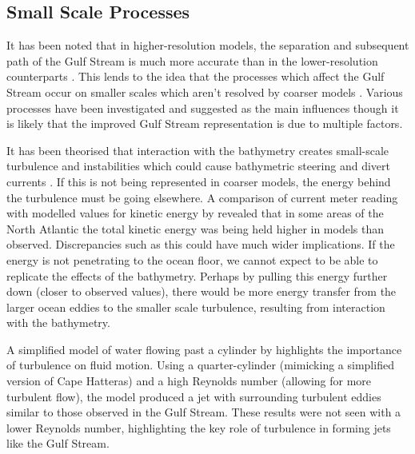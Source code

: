 \documentclass[..\report.tex]{subfiles}
\begin{document}

\subsection{Small Scale Processes}
\label{SSEC:SmallScaleProcesses}

It has been noted that in higher-resolution models, the separation and subsequent path of the Gulf Stream is much more accurate than in the lower-resolution counterparts \citep{Hurlburt2008,Zhang2007}. This lends to the idea that the processes which affect the Gulf Stream occur on smaller scales which aren't resolved by coarser models \citep{NaveiraGarabato2013,Nikurashin2012a}. Various processes have been investigated and suggested as the main influences though it is likely that the improved Gulf Stream representation is due to multiple factors.


It has been theorised that interaction with the bathymetry creates small-scale turbulence and instabilities which could cause bathymetric steering and divert currents \citep{NaveiraGarabato2013}. If this is not being represented in coarser models, the energy behind the turbulence must be going elsewhere. 
A comparison of current meter reading with modelled values for kinetic energy by \citet{Scott2010} revealed that in some areas of the North Atlantic the total kinetic energy was being held higher in models than observed.
Discrepancies such as this could have much wider implications. If the energy is not penetrating to the ocean floor, we cannot expect to be able to replicate the effects of the bathymetry. Perhaps by pulling this energy further down (closer to observed values), there would be more energy transfer from the larger ocean eddies to the smaller scale turbulence, resulting from interaction with the bathymetry.

A simplified model of water flowing past a cylinder by \citet{Tansley2001} highlights the importance of turbulence  on fluid motion.
Using a quarter-cylinder (mimicking a simplified version of Cape Hatteras) and a high Reynolds number (allowing for more turbulent flow), the model produced a jet with surrounding turbulent eddies similar to those observed in the Gulf Stream.
These results were not seen with a lower Reynolds number, highlighting the key role of turbulence in forming jets like the Gulf Stream.
\end{document}
